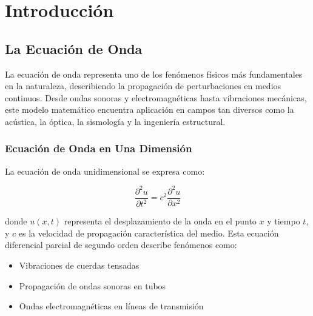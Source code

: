 \documentclass[a4paper]{article}
\begin{document}


\maketitle

\tableofcontents
\newpage

\section{Introducción}

\subsection{La Ecuación de Onda}

La ecuación de onda representa uno de los fenómenos físicos más fundamentales en la naturaleza, describiendo la propagación de perturbaciones en medios continuos. Desde ondas sonoras y electromagnéticas hasta vibraciones mecánicas, este modelo matemático encuentra aplicación en campos tan diversos como la acústica, la óptica, la sismología y la ingeniería estructural.

\subsubsection{Ecuación de Onda en Una Dimensión}

La ecuación de onda unidimensional se expresa como:

\begin{equation}
\frac{\partial^2 u}{\partial t^2} = c^2 \frac{\partial^2 u}{\partial x^2}
\end{equation}

donde $u(x,t)$ representa el desplazamiento de la onda en el punto $x$ y tiempo $t$, y $c$ es la velocidad de propagación característica del medio. Esta ecuación diferencial parcial de segundo orden describe fenómenos como:

\begin{itemize}
\item Vibraciones de cuerdas tensadas
\item Propagación de ondas sonoras en tubos
\item Ondas electromagnéticas en líneas de transmisión
\end{itemize}
\end{document}
